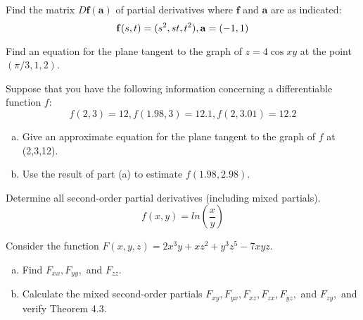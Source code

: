 \documentclass[11pt,letterpaper]{hmcpset}
\begin{document}
	
	\begin{problem}[2.3.33] Find the matrix $D\mathbf{f}(\mathbf{a})$ of partial derivatives where $\mathbf{f}$ and $\mathbf{a}$ are as indicated:
	$$ \mathbf{f}(s,t) = (s^2, st, t^2), \medskip \mathbf{a} = (-1,1)$$
	\end{problem}
	
	\begin{solution}
		\vfill
	\end{solution}
	
	\newpage
	
	\begin{problem}[2.3.38] Find an equation for the plane tangent to the graph of $z = 4\cos{xy}$ at the point $(\pi/3,1,2)$.
	\end{problem}
	
	\begin{solution}
		\vfill
	\end{solution}
	
	\newpage
	
	\begin{problem}[2.3.42] Suppose that you have the following information concerning a differentiable function $f$:
	$$ f(2,3) = 12, f(1.98, 3) = 12.1, f(2, 3.01) = 12.2$$
	\begin{enumerate}[(a)]
		\item Give an approximate equation for the plane tangent to the graph of $f$ at (2,3,12).
		\item Use the result of part (a) to estimate $f(1.98, 2.98)$.
	\end{enumerate}
	\end{problem}
	
	\begin{solution}
		\vfill
	\end{solution}
	
	\newpage
	
	\begin{problem}[2.4.16] Determine all second-order partial derivatives (including mixed partials).
	$$ f(x,y) = ln\left(\frac{x}{y}\right) $$
	\end{problem}
	
	\begin{solution}
		\vfill
	\end{solution}
	
	\newpage
	
	\begin{problem}[2.4.22] Consider the function $F(x,y,z) = 2x^3y + xz^2 + y^3z^5-7xyz$.
	\begin{enumerate}[(a)]
		\item Find $F_{xx}, F_{yy},$ and $F_{zz}$.
		\item Calculate the mixed second-order partials $F_{xy}, F_{yx}, F_{xz}, F_{zx}, F_{yz},$ and $F_{zy},$ and verify Theorem 4.3.
	\end{enumerate}
	\end{problem}
	
\end{document}
